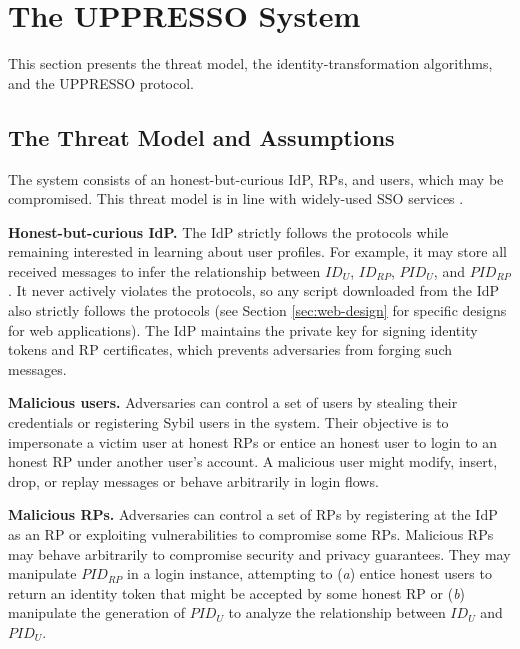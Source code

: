 \section{The UPPRESSO System}
\label{sec:UPPRESSO}

This section presents the threat model, the identity-transformation algorithms, and the UPPRESSO protocol.

\subsection{The Threat Model and Assumptions}
\label{subsec:threatmodel}
The system consists of an honest-but-curious IdP, RPs, and users, which may be compromised. %
This threat model is in line with widely-used SSO services \cite{OpenIDConnect,rfc6749, SAML, SAMLIdentifier, NIST2017draft}.

\noindent \textbf{Honest-but-curious IdP.} The IdP strictly follows the protocols while remaining interested in learning about user profiles.
For example, it may store all received messages to infer the relationship between $ID_U$, $ID_{RP}$, $PID_{U}$, and $PID_{RP}$.
It never actively violates the protocols, so any script downloaded from the IdP also strictly follows the protocols (see Section \ref{sec:web-design} for specific designs for web applications). The IdP maintains the private key for signing identity tokens and RP certificates, %
which prevents adversaries from forging such messages.

\noindent \textbf{Malicious users.} Adversaries can control a set of users by stealing their credentials or registering Sybil users in the system. Their objective is to impersonate a victim user at honest RPs or entice an honest user to login to an honest RP under another user's account.
A malicious user might modify, insert, drop, or replay messages or behave arbitrarily in login flows.

\noindent \textbf{Malicious RPs.}
Adversaries can control a set of RPs by registering at the IdP as an RP or exploiting vulnerabilities to compromise some RPs. Malicious RPs may behave arbitrarily to compromise security and privacy guarantees.
They may manipulate $PID_{RP}$ in a login instance, attempting to (\emph{a}) entice honest users to return an identity token that might be accepted by some honest RP or (\emph{b}) manipulate the generation of $PID_U$ to analyze the relationship between $ID_U$ and $PID_U$.


